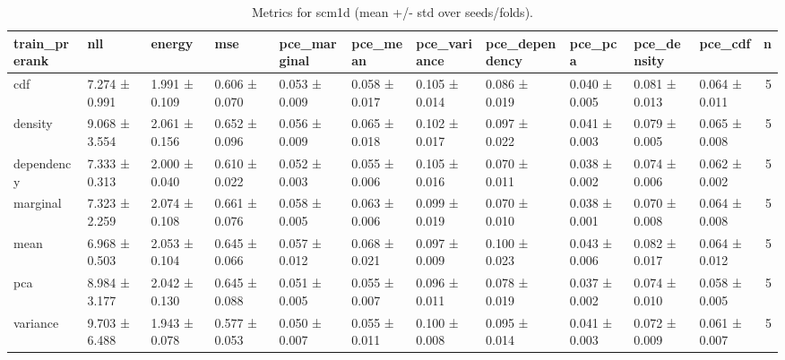 \begin{table}
\caption{Metrics for scm1d (mean +/- std over seeds/folds).}
\label{tab:metrics_summary_scm1d}
\begin{tabular}{lllllllllllr}
\toprule
train_prerank & nll & energy & mse & pce_marginal & pce_mean & pce_variance & pce_dependency & pce_pca & pce_density & pce_cdf & n \\
\midrule
cdf & 7.274 ± 0.991 & 1.991 ± 0.109 & 0.606 ± 0.070 & 0.053 ± 0.009 & 0.058 ± 0.017 & 0.105 ± 0.014 & 0.086 ± 0.019 & 0.040 ± 0.005 & 0.081 ± 0.013 & 0.064 ± 0.011 & 5 \\
density & 9.068 ± 3.554 & 2.061 ± 0.156 & 0.652 ± 0.096 & 0.056 ± 0.009 & 0.065 ± 0.018 & 0.102 ± 0.017 & 0.097 ± 0.022 & 0.041 ± 0.003 & 0.079 ± 0.005 & 0.065 ± 0.008 & 5 \\
dependency & 7.333 ± 0.313 & 2.000 ± 0.040 & 0.610 ± 0.022 & 0.052 ± 0.003 & 0.055 ± 0.006 & 0.105 ± 0.016 & 0.070 ± 0.011 & 0.038 ± 0.002 & 0.074 ± 0.006 & 0.062 ± 0.002 & 5 \\
marginal & 7.323 ± 2.259 & 2.074 ± 0.108 & 0.661 ± 0.076 & 0.058 ± 0.005 & 0.063 ± 0.006 & 0.099 ± 0.019 & 0.070 ± 0.010 & 0.038 ± 0.001 & 0.070 ± 0.008 & 0.064 ± 0.008 & 5 \\
mean & 6.968 ± 0.503 & 2.053 ± 0.104 & 0.645 ± 0.066 & 0.057 ± 0.012 & 0.068 ± 0.021 & 0.097 ± 0.009 & 0.100 ± 0.023 & 0.043 ± 0.006 & 0.082 ± 0.017 & 0.064 ± 0.012 & 5 \\
pca & 8.984 ± 3.177 & 2.042 ± 0.130 & 0.645 ± 0.088 & 0.051 ± 0.005 & 0.055 ± 0.007 & 0.096 ± 0.011 & 0.078 ± 0.019 & 0.037 ± 0.002 & 0.074 ± 0.010 & 0.058 ± 0.005 & 5 \\
variance & 9.703 ± 6.488 & 1.943 ± 0.078 & 0.577 ± 0.053 & 0.050 ± 0.007 & 0.055 ± 0.011 & 0.100 ± 0.008 & 0.095 ± 0.014 & 0.041 ± 0.003 & 0.072 ± 0.009 & 0.061 ± 0.007 & 5 \\
\bottomrule
\end{tabular}
\end{table}
